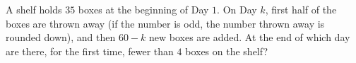 A shelf holds $35$ boxes at the beginning of Day $1$. On Day $k$, first half of the boxes are thrown away (if the number is odd, the number thrown away is rounded down), and then $60-k$ new boxes are added. At the end of which day are there, for the first time, fewer than $4$ boxes on the shelf?
